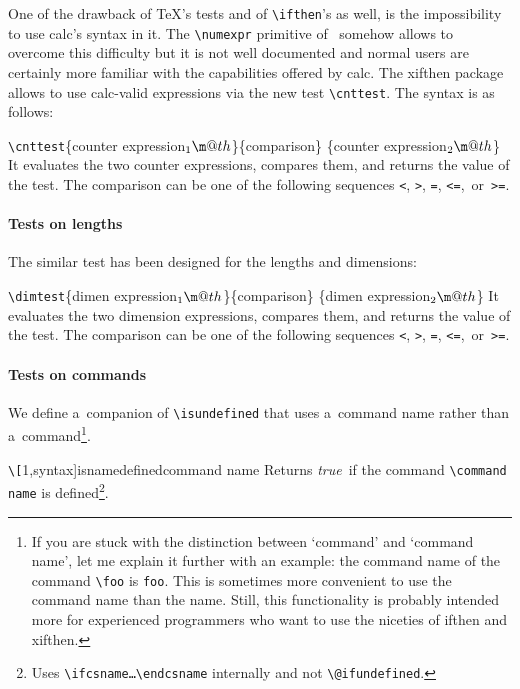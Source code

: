 \documentclass{article}
\makeatletter
\newcommand*{\cmd}[1]{\tex{\textbackslash #1}}
\newcommand*{\tex}{\texttt}
\newenvironment*{texcode}{\list{}{}\item\ttfamily}{\endlist}
\newcommand*{\marg}[1]{\{\meta{#1}\}}
\newcommand*{\meta}[1]{\textnormal{\textlangle#1\textrangle}}
\newcommand*{\1}{$_1\m@th$}
\newcommand*{\2}{$_2\m@th$}
\newcommand*{\pack}{\textsf}
\newcommand*{\true}{\emph{true}}
\makeatother
\begin{document}
One of the drawback of \TeX's tests and of \cmd{ifthen}'s as well, is
the impossibility to use \pack{calc}'s syntax in it.  The
\cmd{numexpr} primitive of \eTeX\ somehow allows to overcome this
difficulty but it is not well documented and normal users are
certainly more familiar with the capabilities offered by \pack{calc}.
The \pack{xifthen} package allows to use \pack{calc}-valid expressions
via the new test \cmd{cnttest}.  The syntax is as follows:
%
\begin{texcode}
  \cmd{cnttest}\marg{counter expression\1}\marg{comparison}%
               \marg{counter expression\2}
\end{texcode}
%
It evaluates the two counter expressions, compares them, and returns
the value of the test.  The comparison can be one of the following
sequences \tex{<}, \tex{>}, \tex{=}, \tex{<=},~or~\tex{>=}.

\paragraph{Tests on lengths}

The similar test has been designed for the lengths and dimensions:
%
\begin{texcode}
  \cmd{dimtest}\marg{dimen expression\1}\marg{comparison}%
               \marg{dimen expression\2}
\end{texcode}
%
It evaluates the two dimension expressions, compares them, and returns
the value of the test.  The comparison can be one of the following
sequences \tex{<}, \tex{>}, \tex{=}, \tex{<=},~or~\tex{>=}.

\paragraph{Tests on commands}

We define a~companion of \cmd{isundefined} that uses a~command name
rather than a~command\footnote{If you are stuck with the distinction
  between `command' and `command name', let me explain it further with
  an example: the command name of the command \cmd{foo} is \tex{foo}.
  This is sometimes more convenient to use the command name than the
  name.  Still, this functionality is probably intended more for
  experienced programmers who want to use the niceties of
  \pack{ifthen} and \pack{xifthen}.}.
%
\begin{texcode}
  \cmd[1,syntax]{isnamedefined}{command name}
\end{texcode}
%
Returns \true\ if the command \cmd{\meta{command name}} is defined\footnote{%
  Uses \tex{\cmd{ifcsname}\dots\allowbreak\cmd{endcsname}} internally
  and not \cmd{@ifundefined}.}.
\end{document}
